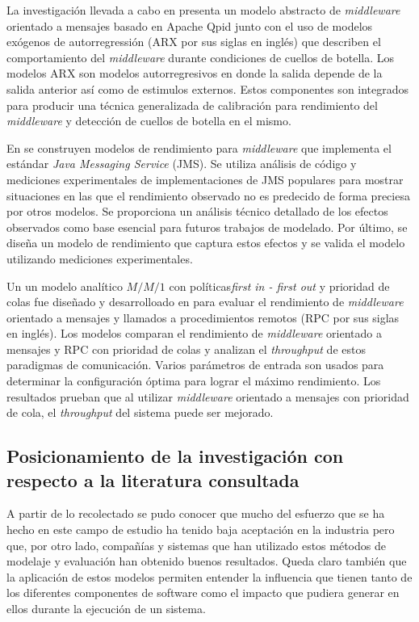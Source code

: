 \documentclass[11pt, twoside]{report}
\begin{document}
La investigación llevada a cabo en \cite{chew} presenta un modelo abstracto de \emph{middleware} orientado a mensajes basado en Apache Qpid junto con el uso de modelos exógenos de autorregressión (ARX por sus siglas en inglés) que describen el comportamiento del \emph{middleware} durante condiciones de cuellos de botella. Los modelos ARX son modelos autorregresivos en donde la salida depende de la salida anterior así como de estimulos externos. Estos componentes son integrados para producir una técnica generalizada de calibración para rendimiento del \emph{middleware} y detección de cuellos de botella en el mismo.

En \cite{martince-et-al} se construyen modelos de rendimiento para \emph{middleware} que implementa el estándar \emph{Java Messaging Service} (JMS). Se utiliza análisis de código y mediciones experimentales de implementaciones de JMS populares para mostrar situaciones en las que el rendimiento observado no es predecido de forma preciesa por otros modelos. Se proporciona un análisis técnico detallado de los efectos observados como base esencial para futuros trabajos de modelado. Por último, se diseña un modelo de rendimiento que captura estos efectos y se valida el modelo utilizando mediciones experimentales.

Un un modelo analítico $M/M/1$ con políticas\emph{first in - first out} y prioridad de colas fue diseñado y desarrolloado en \cite{alwakeel} para evaluar el rendimiento de \emph{middleware} orientado a mensajes y llamados a procedimientos remotos (RPC por sus siglas en inglés). Los modelos comparan el rendimiento de \emph{middleware} orientado a mensajes y RPC con prioridad de colas y analizan el \emph{throughput} de estos paradigmas de comunicación. Varios parámetros de entrada son usados para determinar la configuración óptima para lograr el máximo rendimiento. Los resultados prueban que al utilizar \emph{middleware} orientado a mensajes con prioridad de cola, el \emph{throughput} del sistema puede ser mejorado. 

\subsection{Posicionamiento de la investigación con respecto a la literatura consultada}
A partir de lo recolectado se pudo conocer que mucho del esfuerzo que se ha hecho en este campo de estudio ha tenido baja aceptación en la industria pero que, por otro lado, compañías y sistemas que han utilizado estos métodos de modelaje y evaluación han obtenido buenos resultados. Queda claro también que la aplicación de estos modelos permiten entender la influencia que tienen tanto de los diferentes componentes de software como el impacto que pudiera generar en ellos durante la ejecución de un sistema.
\end{document}
